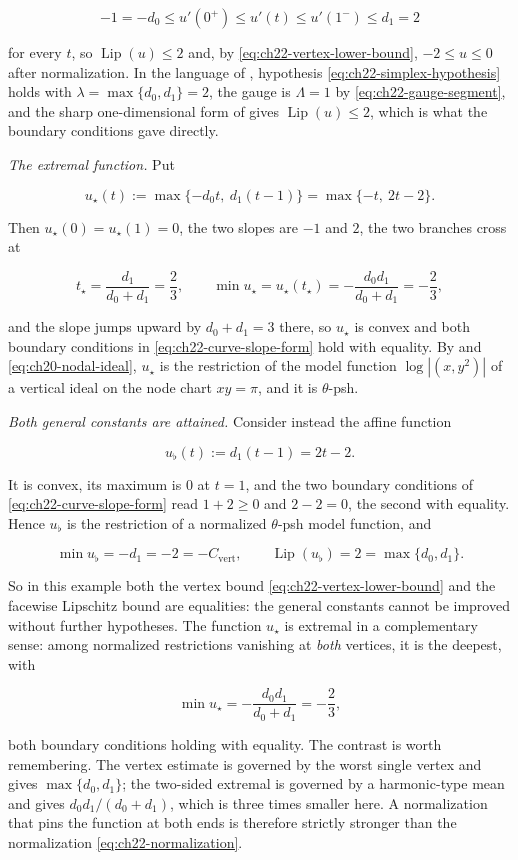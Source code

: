 \begin{example}
\[
 -1=-d_0\leq u'(0^+)\leq u'(t)\leq u'(1^-)\leq d_1=2
\]

for every \(t\), so \(\operatorname{Lip}(u)\leq2\) and, by
\eqref{eq:ch22-vertex-lower-bound}, \(-2\leq u\leq0\) after normalization.
In the language of , hypothesis
\eqref{eq:ch22-simplex-hypothesis} holds with
\(\lambda=\max\{d_0,d_1\}=2\), the gauge is \(\Lambda=1\) by
\eqref{eq:ch22-gauge-segment}, and the sharp one-dimensional form of
 gives \(\operatorname{Lip}(u)\leq2\), which
is what the boundary conditions gave directly.

\emph{The extremal function.}  Put

\[
 u_\star(t):=\max\{-d_0t,\ d_1(t-1)\}=\max\{-t,\ 2t-2\}.
\tag{22.57}\label{eq:ch22-extremal-segment}
\]

Then \(u_\star(0)=u_\star(1)=0\), the two slopes are \(-1\) and \(2\), the
two branches cross at

\[
 t_\star=\frac{d_1}{d_0+d_1}=\frac23,
 \qquad
 \min u_\star=u_\star(t_\star)=-\frac{d_0d_1}{d_0+d_1}=-\frac23 ,
\]

and the slope jumps upward by \(d_0+d_1=3\) there, so \(u_\star\) is convex
and both boundary conditions in \eqref{eq:ch22-curve-slope-form} hold with
equality.  By  and
\eqref{eq:ch20-nodal-ideal}, \(u_\star\) is the restriction of the model
function \(\log|(x,y^2)|\) of a vertical ideal on the node chart
\(xy=\pi\), and it is \(\theta\)-psh.

\emph{Both general constants are attained.}  Consider instead the affine
function

\[
 u_\flat(t):=d_1(t-1)=2t-2 .
\tag{22.58}\label{eq:ch22-flat-extremal}
\]

It is convex, its maximum is \(0\) at \(t=1\), and the two boundary
conditions of \eqref{eq:ch22-curve-slope-form} read \(1+2\geq0\) and
\(2-2=0\), the second with equality.  Hence \(u_\flat\) is the restriction
of a normalized \(\theta\)-psh model function, and

\[
 \min u_\flat=-d_1=-2=-C_{\mathrm{vert}},
 \qquad
 \operatorname{Lip}(u_\flat)=2=\max\{d_0,d_1\}.
\tag{22.59}\label{eq:ch22-segment-sharp-constants}
\]

So in this example both the vertex bound
\eqref{eq:ch22-vertex-lower-bound} and the facewise Lipschitz bound are
equalities: the general constants cannot be improved without further
hypotheses.  The function \(u_\star\) is extremal in a complementary sense:
among normalized restrictions vanishing at \emph{both} vertices, it is the
deepest, with

\[
 \min u_\star=-\frac{d_0d_1}{d_0+d_1}=-\frac23 ,
\]

both boundary conditions holding with equality.  The contrast is worth
remembering.  The vertex estimate is governed by the worst single vertex and
gives \(\max\{d_0,d_1\}\); the two-sided extremal is governed by a
harmonic-type mean and gives \(d_0d_1/(d_0+d_1)\), which is three times
smaller here.  A normalization that pins the function at both ends is
therefore strictly stronger than the normalization
\eqref{eq:ch22-normalization}.
\end{example}

